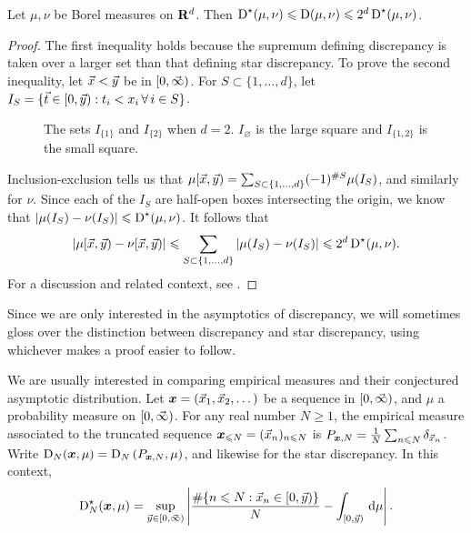 \begin{lemma}
Let $\mu,\nu$ be Borel measures on $\mathbf{R}^d$. Then 
$\operatorname{D}^\star(\mu,\nu) \leqslant \operatorname{D}(\mu,\nu) \leqslant 2^d \operatorname{D}^\star(\mu,\nu)$. 
\end{lemma}
\begin{proof}
The first inequality holds because the supremum defining discrepancy is 
taken over a larger set than that defining star discrepancy. To prove the 
second inequality, let $\vec{x}<\vec{y}$ be in $[0,\vec{\infty})$. For 
$S\subset \{1,\dots,d\}$, let 
$I_S = \{ \vec{t} \in [0,\vec{y}) : t_i < x_i \,\forall\,i\in S\}$.
\begin{figure}[h]
\caption{The sets $I_{\{1\}}$ and $I_{\{2\}}$ when $d = 2$. $I_\varnothing$ is 
the large square and $I_{\{1,2\}}$ is the small square.}
\centering
{}
\end{figure}
Inclusion-exclusion tells us that 
$\mu[\vec{x},\vec{y}) = \sum_{S\subset \{1,\dots,d\}} (-1)^{\# S} \mu(I_S)$, 
and similarly for $\nu$. Since each of the $I_S$ are half-open boxes 
intersecting the origin, we know that 
$|\mu(I_S) - \nu(I_S)| \leqslant \operatorname{D}^\star(\mu,\nu)$. It follows that 
\[
	|\mu[\vec{x},\vec{y}) - \nu[\vec{x},\vec{y})| \leqslant \sum_{S\subset \{1,\dots,d\}} |\mu(I_S) - \nu(I_S)| \leqslant 2^d \operatorname{D}^\star(\mu,\nu) .
\]
For a discussion and related context, see 
\cite[Ch.~2 Ex.~1.2]{kuipers-niederreiter-1974}. 
\end{proof}

Since we are only interested in the asymptotics of discrepancy, we will 
sometimes gloss over the distinction between discrepancy and star discrepancy, 
using whichever makes a proof easier to follow. 

We are usually interested in comparing empirical measures and their conjectured 
asymptotic distribution. Let ${\boldsymbol x} = (\vec{x}_1,\vec{x}_2,\dots)$ be a sequence in 
$[0,\vec{\infty})$, and $\mu$ a probability measure on $[0,\vec{\infty})$. For any real 
number $N\geqslant 1$, the empirical measure associated to the truncated 
sequence ${\boldsymbol x}_{\leqslant N} = (\vec{x}_n)_{n\leqslant N}$ is 
$P_{{\boldsymbol x},N} = \frac{1}{N} \sum_{n\leqslant N} \delta_{\vec{x}_n}$. Write 
$\operatorname{D}_N({\boldsymbol x},\mu) = \operatorname{D}_N\left( P_{{\boldsymbol x},N},\mu\right)$, and likewise for the star 
discrepancy. In this context, 
\[
	\operatorname{D}^\star_N({\boldsymbol x},\mu) = \sup_{\vec{y}\in [0,\vec{\infty})} \left| \frac{\# \{n\leqslant N : \vec{x}_n \in [0,\vec{y})\}}{N} - \int_{[0,\vec{y})} \, \mathrm{d}\mu\right| .
\]

